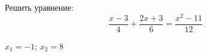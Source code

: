 \begin{ex}
	Решить уравнение:
	$$ \dfrac{x-3}{4}+\dfrac{2x+3}{6}=\dfrac{x^2-11}{12} $$
	\begin{answer}
		$x_1=-1$; $x_2=8$
	\end{answer}
\end{ex}